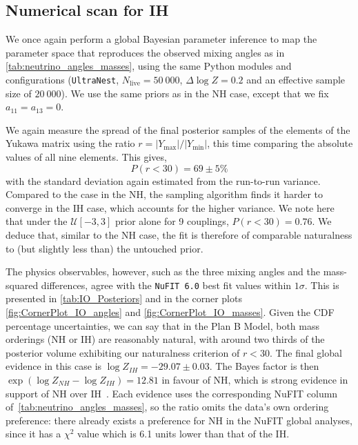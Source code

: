 \documentclass[11pt,letterpaper]{article}
\newcommand{\model}{Plan B Model}
\begin{document}
\subsection{Numerical scan for IH}

We once again perform a global Bayesian parameter inference to map the parameter space that reproduces the observed mixing angles as in \cref{tab:neutrino_angles_masses}, using the same Python
modules and configurations (\texttt{UltraNest}, $N_{\mathrm{live}} = 50\ 000$, $\Delta \log Z = 0.2$ and an effective sample size of $20\ 000$). 
We use the same priors as in the NH case, except that we fix $a_{11}=a_{13}=0$.

We again measure the spread of the final posterior samples of the elements of the Yukawa matrix using the ratio $r = |Y_{\text{max}}|/|Y_{\text{min}}|$, this time comparing the absolute values of all nine elements. This gives,
\begin{equation} \label{IO:CDFPercent}
    P(r<30) = 69 \pm 5 \%
\end{equation}
with the standard deviation again estimated from the run-to-run
variance. Compared to the case in the NH, the
sampling algorithm
finds it harder to converge in the IH case, which accounts for the higher variance.
We note here that under the $\mathcal{U}[-3,3]$ prior alone for 9 couplings,
$P(r<30)=0.76$. We deduce that, similar to the NH case, the fit is therefore of comparable naturalness to
(but slightly less than) the untouched prior.


The physics observables, however, such as the
three mixing angles and the mass-squared differences, agree with the
{\tt NuFIT 6.0} \cite{Esteban:2024eli} best fit values within $1 \sigma$. This
is presented in \cref{tab:IO_Posteriors} and in the corner plots \cref{fig:CornerPlot_IO_angles} and \cref{fig:CornerPlot_IO_masses}. Given the CDF percentage
uncertainties, we can say that in the \model, both mass orderings (NH or IH) are reasonably natural, with around two thirds
of the posterior volume exhibiting our naturalness criterion of $r<30$. The
final global evidence in this case is $\log Z_{IH} = -29.07 \pm 0.03$. The
Bayes factor is then $\exp (\log Z_{NH} - \log Z_{IH}) = 12.81$ in favour of
NH, which is strong evidence in support of NH over
IH~\cite{jeffreys_theory_1998, lee_bayesian_2014}.
Each evidence uses the corresponding NuFIT column of~\cref{tab:neutrino_angles_masses}, so the
ratio omits the data's own ordering preference:
there already exists a
preference for NH in the NuFIT global analyses, since it has a $\chi^2$ value
which is 6.1 units lower than that of the IH. 
\end{document}
